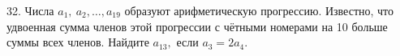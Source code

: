 32. Числа $a_1,\ a_2,\ldots,a_{19}$ образуют арифметическую прогрессию. Известно, что удвоенная сумма членов этой прогрессии с чётными номерами на 10 больше суммы всех членов. Найдите $a_{13},$ если $a_{3}=2a_4.$\\
